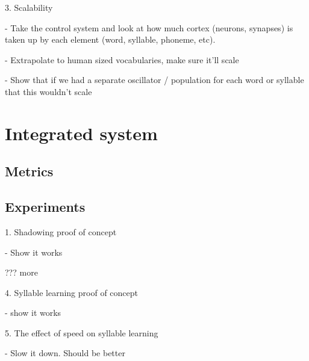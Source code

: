 3. Scalability

- Take the control system and look at how much cortex (neurons, synapses)
  is taken up by each element (word, syllable, phoneme, etc).

- Extrapolate to human sized vocabularies, make sure it'll scale

- Show that if we had a separate oscillator / population
  for each word or syllable that this wouldn't scale

\section{Integrated system}

\subsection{Metrics}

\subsection{Experiments}

1. Shadowing proof of concept

- Show it works

??? more

4. Syllable learning proof of concept

- show it works

5. The effect of speed on syllable learning

- Slow it down. Should be better
